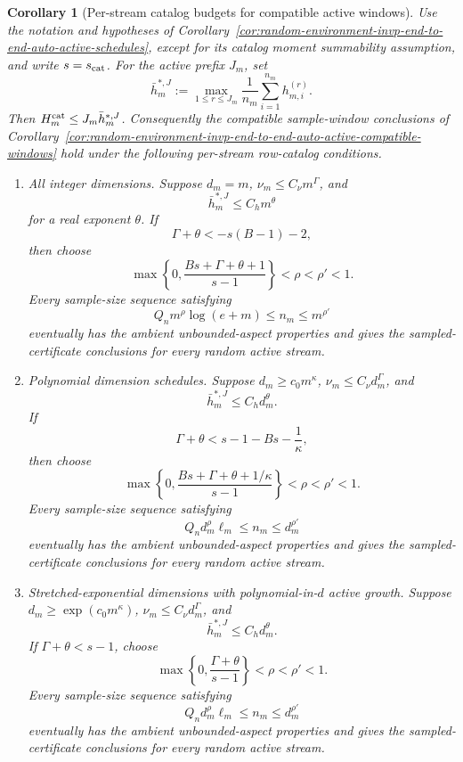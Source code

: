 \documentclass[11pt]{amsart}
\numberwithin{equation}{section}
\newtheorem{corollary}[theorem]{Corollary}
\theoremstyle{definition}
\theoremstyle{remark}
\begin{document}
\begin{corollary}[Per-stream catalog budgets for compatible active windows]
\label{cor:random-environment-invp-end-to-end-auto-active-per-stream-catalog-windows}
Use the notation and hypotheses of
Corollary~\ref{cor:random-environment-invp-end-to-end-auto-active-schedules},
except for its catalog moment summability assumption, and write
\(s=s_{\rm cat}\).  For the active prefix \(J_m\), set
\[
  \bar h_m^{*,J}:=
  \max_{1\le r\le J_m}\frac1{n_m}\sum_{i=1}^{n_m}h_{m,i}^{(r)} .
\]
Then \(H_m^{\rm cat}\le J_m\bar h_m^{*,J}\).  Consequently the
compatible sample-window conclusions of
Corollary~\ref{cor:random-environment-invp-end-to-end-auto-active-compatible-windows}
hold under the following per-stream row-catalog conditions.

\begin{enumerate}[label=\textup{(\roman*)},leftmargin=2.2em]
\item All integer dimensions.  Suppose \(d_m=m\), \(\nu_m\le C_\nu m^\Gamma\),
and
\[
  \bar h_m^{*,J}\le C_h m^\theta
\]
for a real exponent \(\theta\).  If
\[
  \Gamma+\theta<-s(B-1)-2,
\]
then choose
\[
  \max\left\{0,\frac{Bs+\Gamma+\theta+1}{s-1}\right\}<\rho<\rho'<1 .
\]
Every sample-size sequence satisfying
\[
  Q_n m^\rho\log(e+m)\le n_m\le m^{\rho'}
\]
eventually has the ambient unbounded-aspect properties and gives the
sampled-certificate conclusions for every random active stream.

\item Polynomial dimension schedules.  Suppose \(d_m\ge c_0m^\kappa\),
\(\nu_m\le C_\nu d_m^\Gamma\), and
\[
  \bar h_m^{*,J}\le C_h d_m^\theta .
\]
If
\[
  \Gamma+\theta<s-1-Bs-\frac1\kappa,
\]
then choose
\[
  \max\left\{0,\frac{Bs+\Gamma+\theta+1/\kappa}{s-1}\right\}<\rho<\rho'<1 .
\]
Every sample-size sequence satisfying
\[
  Q_n d_m^\rho\ell_m\le n_m\le d_m^{\rho'}
\]
eventually has the ambient unbounded-aspect properties and gives the
sampled-certificate conclusions for every random active stream.

\item Stretched-exponential dimensions with polynomial-in-\(d\) active growth.
Suppose \(d_m\ge\exp(c_0m^\kappa)\), \(\nu_m\le C_\nu d_m^\Gamma\), and
\[
  \bar h_m^{*,J}\le C_h d_m^\theta .
\]
If \(\Gamma+\theta<s-1\), choose
\[
  \max\left\{0,\frac{\Gamma+\theta}{s-1}\right\}<\rho<\rho'<1 .
\]
Every sample-size sequence satisfying
\[
  Q_n d_m^\rho\ell_m\le n_m\le d_m^{\rho'}
\]
eventually has the ambient unbounded-aspect properties and gives the
sampled-certificate conclusions for every random active stream.


\end{enumerate}
\end{corollary}
\end{document}
